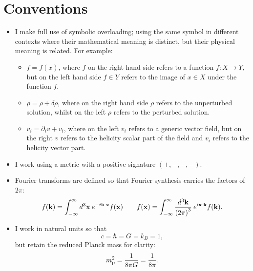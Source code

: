 \chapter*{Conventions}
\label{sec:cos:conventions}


\begin{itemize}
  \item I make full use of symbolic overloading; using the same symbol in different contexts where their mathematical meaning is distinct, but their physical meaning is related. For example:
    \begin{itemize}
      \item $f=f(x)$, where $f$ on the right hand side refers to a function ${f:X\to Y}$, but on the left hand side $f\in Y$ refers to the image of $x\in X$ under the function $f$.
      \item $\rho = \rho + \delta\rho$, where on the right hand side $\rho$ refers to the unperturbed solution, whilst on the left $\rho$ refers to the perturbed solution.
      \item $v_i = \partial_i v + v_i$, where on the left $v_i$ refers to a generic vector field, but on the right $v$ refers to the helicity scalar part of the field and $v_i$ refers to the helicity vector part.
    \end{itemize}
  \item I work using a metric with a positive signature $(+,-,-,-)$.
  \item Fourier transforms are defined so that Fourier synthesis carries the factors of $2\pi$:
    \begin{equation}
      f(\mathbf{k}) = \int_{-\infty}^{\infty} d^3\mathbf{x}\: e^{-i \mathbf{k}\cdot\mathbf{x}} f(\mathbf{x}) \qquad f(\mathbf{x}) = \int_{-\infty}^{\infty} \frac{d^3\mathbf{k}}{{(2\pi)}^3}\: e^{i \mathbf{x}\cdot\mathbf{k}} f(\mathbf{k}).
      \label{eqn:cos:fourier_transform}
    \end{equation}
  \item I work in natural units so that 
    \begin{equation}
      c = \hbar = G = k_B = 1,
      \label{eqn:cos:natural_units}
    \end{equation}
    but retain the reduced Planck mass for clarity:
    \begin{equation}
      m_{\mathrm{p}}^2 = \frac{1}{8\pi G} = \frac{1}{8\pi}.
      \label{eqn:cos:reduced_planck_mass}
    \end{equation}
\end{itemize}

\cleardoublepage{}
